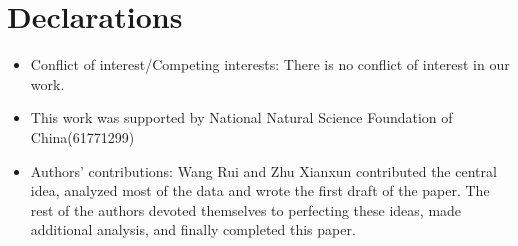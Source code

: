\documentclass[preprint,12pt]{elsarticle}
\begin{document}
\section*{Declarations}
\begin{itemize}
\item Conflict of interest/Competing interests: There is no conflict of interest in our work.
\item This work was supported by National Natural Science Foundation of China(61771299)
\item Authors' contributions: Wang Rui and Zhu Xianxun contributed the central idea, analyzed most of the data and wrote the first draft of the paper. The rest of the authors devoted themselves to perfecting these ideas, made additional analysis, and finally completed this paper.
\end{itemize}
\end{document}
